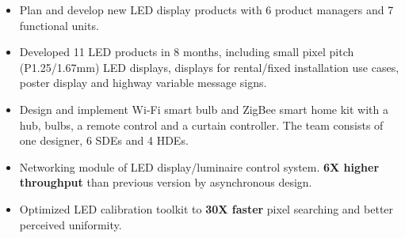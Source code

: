 \documentclass[11pt,a4paper]{moderncv/moderncv}
\begin{document}
{
\begin{itemize}
	\item Plan and develop new LED display products with 6 product managers and 7 functional units.
	\item Developed 11 LED products in 8 months, including small pixel pitch (P1.25/1.67mm) LED displays, displays for rental/fixed installation use cases, poster display and highway variable message signs.
	\item Design and implement Wi-Fi smart bulb and ZigBee smart home kit with a hub, bulbs, a remote control and a curtain controller. The team consists of one designer, 6 SDEs and 4 HDEs.
\end{itemize}
}

{
\begin{itemize}
	\item Networking module of LED display/luminaire control system. \textbf{6X higher throughput} than previous version by asynchronous design.
	\item Optimized LED calibration toolkit to \textbf{30X faster} pixel searching and better perceived uniformity.
\end{itemize}
}

{
}
\end{document}
